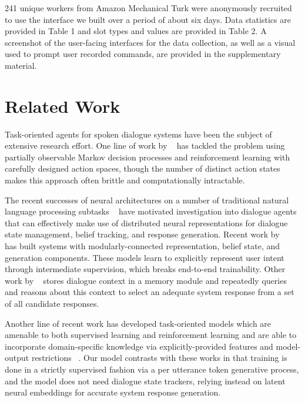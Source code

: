\documentclass[11pt,a4paper]{article}
\begin{document}
  241 unique workers from Amazon Mechanical Turk were anonymously recruited to use the interface we built over a period of about six days. Data statistics are provided in Table 1 and slot types and values are provided in Table 2. A screenshot of the user-facing interfaces for the data collection, as well as a visual used to prompt user recorded commands, are provided in the supplementary material. \\

\section{Related Work}
   Task-oriented agents for spoken dialogue systems have been the subject of extensive research effort. One line of work by ~\cite{Young:13} has tackled the problem using partially observable Markov decision processes and reinforcement learning with carefully designed action spaces, though the number of distinct action states makes this approach often brittle and computationally intractable.

  The recent successes of neural architectures on a number of traditional natural language processing subtasks ~\cite{Bahdanau:14,NIPS2014_5346,NIPS2015_5635} have motivated investigation into dialogue agents that can effectively make use of distributed neural representations for dialogue state management, belief tracking, and response generation. Recent work by ~\cite{Wen:16} has built systems with modularly-connected representation, belief state, and generation components. These models learn to explicitly represent user intent through intermediate supervision, which breaks end-to-end trainability. Other work by ~\cite{Bordes:16,Liu-Perez:16} stores dialogue context in a memory module and repeatedly queries and reasons about this context to select an adequate system response from a set of all candidate responses. 

  Another line of recent work has developed task-oriented models which are amenable to both supervised learning and reinforcement learning and are able to incorporate domain-specific knowledge via explicitly-provided features and model-output restrictions ~\cite{Williams:17}. Our model contrasts with these works in that training is done in a strictly supervised fashion via a per utterance token generative process, and the model does not need dialogue state trackers, relying instead on latent neural embeddings for accurate system response generation.
\end{document}
